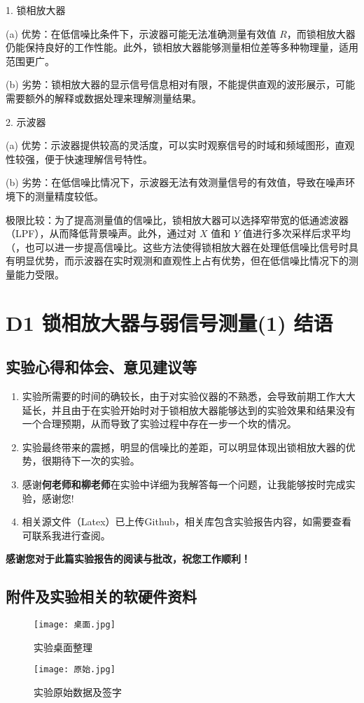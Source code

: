\documentclass[dvipsnames, svgnames,a4paper,11pt]{article}
\begin{document}
		1. 锁相放大器

		   (a) 优势：在低信噪比条件下，示波器可能无法准确测量有效值 \( R \)，而锁相放大器仍能保持良好的工作性能。此外，锁相放大器能够测量相位差等多种物理量，适用范围更广。

		   (b) 劣势：锁相放大器的显示信号信息相对有限，不能提供直观的波形展示，可能需要额外的解释或数据处理来理解测量结果。
		
		2. 示波器

		   (a) 优势：示波器提供较高的灵活度，可以实时观察信号的时域和频域图形，直观性较强，便于快速理解信号特性。

		   (b) 劣势：在低信噪比情况下，示波器无法有效测量信号的有效值，导致在噪声环境下的测量精度较低。
		
		极限比较：为了提高测量值的信噪比，锁相放大器可以选择窄带宽的低通滤波器（LPF），从而降低背景噪声。此外，通过对 \( X \) 值和 \( Y \) 值进行多次采样后求平均（，也可以进一步提高信噪比。这些方法使得锁相放大器在处理低信噪比信号时具有明显优势，而示波器在实时观测和直观性上占有优势，但在低信噪比情况下的测量能力受限。
	\clearpage
	
	\section{D1 锁相放大器与弱信号测量(1) \quad\heiti 结语}
	
	\subsection{实验心得和体会、意见建议等}
	\begin{enumerate}
		\item 实验所需要的时间的确较长，由于对实验仪器的不熟悉，会导致前期工作大大延长，并且由于在实验开始时对于锁相放大器能够达到的实验效果和结果没有一个合理预期，从而导致了实验过程中存在一步一个坎的情况。
		\item 实验最终带来的震撼，明显的信噪比的差距，可以明显体现出锁相放大器的优势，很期待下一次的实验。
		\item 感谢\textbf{何老师和柳老师}在实验中详细为我解答每一个问题，让我能够按时完成实验，感谢您!
		\item 相关源文件（Latex）已上传Github，相关库包含实验报告内容，如需要查看可联系我进行查阅。
	\end{enumerate}
	\quad \large \textbf{感谢您对于此篇实验报告的阅读与批改，祝您工作顺利！}
	

	\subsection{附件及实验相关的软硬件资料}
	\begin{figure}[{H}]
		\centering
		\texttt{[image: 桌面.jpg]}
		\caption{实验桌面整理}
		\label{}
	\end{figure}
	

	\begin{figure}[{H}]
		\centering
		\texttt{[image: 原始.jpg]}
		\caption{实验原始数据及签字}
		\label{}
	\end{figure}

	
	
\end{document}
